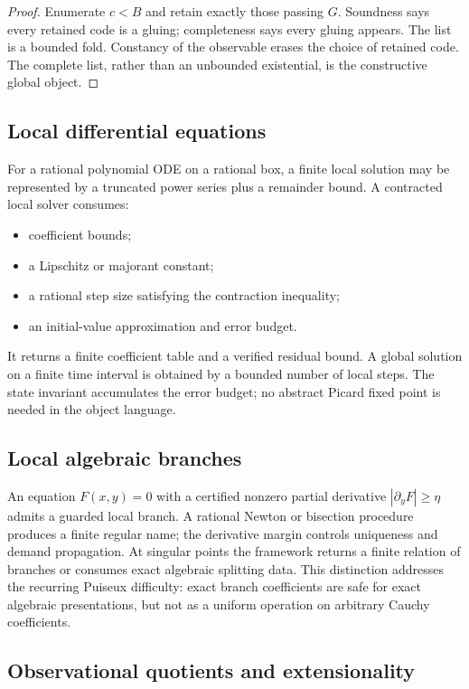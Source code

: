 \begin{proof}
Enumerate \(c<B\) and retain exactly those passing \(G\).  Soundness says every
retained code is a gluing; completeness says every gluing appears.  The list is
a bounded fold.  Constancy of the observable erases the choice of retained
code.  The complete list, rather than an unbounded existential, is the
constructive global object.
\end{proof}

\subsection{Local differential equations}

For a rational polynomial ODE on a rational box, a finite local solution may
be represented by a truncated power series plus a remainder bound.  A
contracted local solver consumes:
\begin{itemize}
\item coefficient bounds;
\item a Lipschitz or majorant constant;
\item a rational step size satisfying the contraction inequality;
\item an initial-value approximation and error budget.
\end{itemize}
It returns a finite coefficient table and a verified residual bound.  A global
solution on a finite time interval is obtained by a bounded number of local
steps.  The state invariant accumulates the error budget; no abstract Picard
fixed point is needed in the object language.

\subsection{Local algebraic branches}

An equation \(F(x,y)=0\) with a certified nonzero partial derivative
\(|\partial_yF|\ge\eta\) admits a guarded local branch.  A rational Newton or
bisection procedure produces a finite regular name; the derivative margin
controls uniqueness and demand propagation.  At singular points the framework
returns a finite relation of branches or consumes exact algebraic splitting
data.  This distinction addresses the recurring Puiseux difficulty: exact
branch coefficients are safe for exact algebraic presentations, but not as a
uniform operation on arbitrary Cauchy coefficients.

\subsection{Observational quotients and extensionality}

